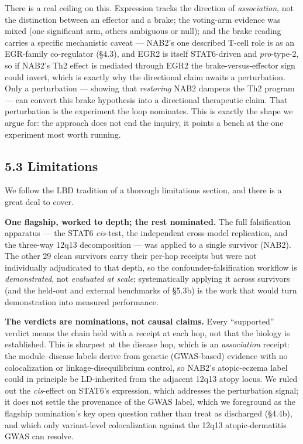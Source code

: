 There is a real ceiling on this. Expression tracks the direction of \emph{association}, not the
distinction between an effector and a brake; the voting-arm evidence was mixed (one significant arm, others
ambiguous or null); and the brake reading carries a specific mechanistic caveat --- NAB2's one described T-cell
role is as an EGR-family co-regulator (\S{}4.3), and EGR2 is itself STAT6-driven and \emph{pro}-type-2, so if
NAB2's Th2 effect is mediated through EGR2 the brake-versus-effector sign could invert, which is exactly why the
directional claim awaits a perturbation. Only a perturbation --- showing that \emph{restoring} NAB2 dampens the
Th2 program --- can convert this brake hypothesis into a directional therapeutic claim. That perturbation is the experiment the
loop nominates. This is exactly the shape we argue for: the approach does not end the inquiry, it points a
bench at the one experiment most worth running.

\subsection*{5.3 Limitations}\label{limitations}

We follow the LBD tradition of a thorough limitations section, and there is a great deal to cover.

\noindent \textbf{One flagship, worked to depth; the rest nominated.} The full falsification apparatus --- the STAT6
\emph{cis}-test, the independent cross-model replication, and the three-way 12q13 decomposition --- was
applied to a single survivor (NAB2). The other 29 clean survivors carry their per-hop receipts but were not
individually adjudicated to that depth, so the confounder-falsification workflow is \emph{demonstrated}, not
\emph{evaluated at scale}; systematically applying it across survivors (and the held-out and external
benchmarks of \S5.3b) is the work that would turn demonstration into measured performance.

\noindent \textbf{The verdicts are nominations, not causal claims.} Every ``supported'' verdict means the chain held with a
receipt at each hop, not that the biology is established. This is sharpest at the disease hop, which is an
\emph{association} receipt: the module--disease labels derive from genetic (GWAS-based) evidence with no
colocalization or linkage-disequilibrium control, so NAB2's atopic-eczema label could in principle be
LD-inherited from the adjacent 12q13 atopy locus. We ruled out the \emph{cis}-effect on STAT6's expression, which
addresses the perturbation signal; it does not settle the provenance of the GWAS label, which we foreground
as the flagship nomination's key open question rather than treat as discharged (\S{}4.4b), and which only
variant-level colocalization against the 12q13 atopic-dermatitis GWAS can resolve.

